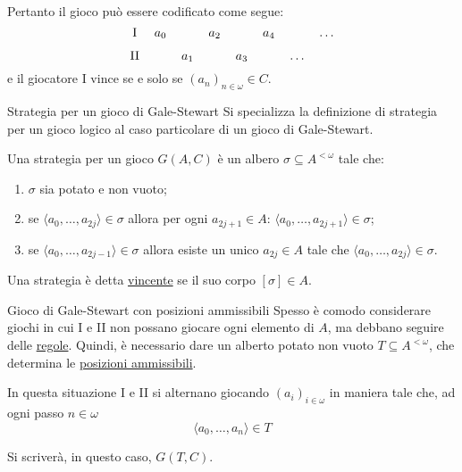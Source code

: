 \documentclass[babel]{beamer}
\renewcommand{\href}[2]{#2}
\begin{document}
\begin{frame}[label={sec:orgbd541f3}]
Pertanto il gioco può essere codificato come segue:
\begin{equation*}
\begin{tikzcd}[ampersand replacement=\&,cramped,sep=tiny]
	{\text{I}} \& {a_0} \&\& {a_2} \&\& {a_4} \&\& \dots \\
	{\text{II}} \&\& {a_1} \&\& {a_3} \&\& \dots
\end{tikzcd}
\end{equation*}
e il giocatore I vince se e solo se \((a_{n})_{n \in \omega} \in C\).
\end{frame}
\begin{frame}[label={sec:org46289cb}]{Strategia per un gioco di Gale-Stewart}
Si specializza la definizione di \href{../../../../../../../org/roam/20250513155732-logic_game.org}{strategia per un gioco logico} al caso particolare di un gioco di Gale-Stewart.

Una strategia per un gioco \(G(A,C)\) è un \href{../../../../../../../org/roam/20250514142154-albero_teoria_descrittiva_degli_insiemi.org}{albero} \(\sigma \subseteq A^{<\omega}\) tale che:
\begin{enumerate}
\item \(\sigma\) sia \href{../../../../../../../org/roam/20250514142208-albero_potato.org}{potato} e non vuoto;

\item se \(\langle a_{0},\dots,a_{2j}\rangle \in \sigma\) allora per ogni \(a_{2j+1} \in A\): \(\langle a_{0},\dots,a_{2j+1}\rangle \in \sigma\);

\item se \(\langle a_{0},\dots,a_{2j-1}\rangle \in \sigma\) allora esiste un unico \(a_{2j} \in A\) tale che \(\langle a_{0},\dots,a_{2j}\rangle \in \sigma\).
\end{enumerate}

Una strategia è detta \uline{vincente} se il suo \href{../../../../../../../org/roam/20250514142251-corpo_di_un_albero.org}{corpo} \([\sigma] \in A\).
\end{frame}
\begin{frame}[label={sec:orgaf782d8}]{Gioco di Gale-Stewart con posizioni ammissibili}
Spesso è comodo considerare giochi in cui I e II non possano giocare ogni elemento di \(A\), ma debbano seguire delle \uline{regole}. Quindi, è necessario dare un alberto potato non vuoto \(T \subseteq A^{<\omega}\), che determina le \href{../../../../../../../org/roam/20250514142938-posizioni_ammissibili_in_un_gioco_logico.org}{\uline{posizioni ammissibili}}.

In questa situazione I e II si alternano giocando \((a_{i})_{i \in \omega}\) in maniera tale che, ad ogni passo \(n \in \omega\)
\begin{equation*}
\langle a_{0},\dots,a_{n}\rangle \in T
\end{equation*}

Si scriverà, in questo caso, \(G(T, C)\).
\end{frame}
\end{document}
